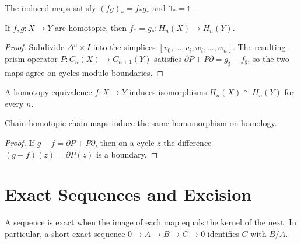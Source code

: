 The induced maps satisfy $(fg)_*=f_*g_*$ and $\mathbb{1}_*=\mathbb{1}$.

\begin{theorem}
\label{thm:homotopic-maps-induce-same-homology-map}

If $f,g:X\to Y$ are homotopic, then $f_*=g_*:H_n(X)\to H_n(Y)$.
\end{theorem}
\begin{proof}
\sketch Subdivide $\Delta^n\times I$ into the simplices $[v_0,\ldots,v_i,w_i,\ldots,w_n]$.  The resulting prism operator $P:C_n(X)\to C_{n+1}(Y)$ satisfies $\partial P+P\partial=g_\sharp-f_\sharp$, so the two maps agree on cycles modulo boundaries.
\end{proof}

\begin{corollary}
\label{cor:homotopy-equivalence-induces-homology-isomorphism}

A homotopy equivalence $f:X\to Y$ induces isomorphisms $H_n(X)\cong H_n(Y)$ for every $n$.
\end{corollary}

\begin{proposition}
\label{prop:chain-homotopic-maps-induce-same-homology-map}

Chain-homotopic chain maps induce the same homomorphism on homology.
\end{proposition}
\begin{proof}
\sketch If $g-f=\partial P+P\partial$, then on a cycle $z$ the difference $(g-f)(z)=\partial P(z)$ is a boundary.
\end{proof}

\section*{Exact Sequences and Excision}

A sequence is exact when the image of each map equals the kernel of the next.  In particular, a short exact sequence $0\to A\to B\to C\to0$ identifies $C$ with $B/A$.

